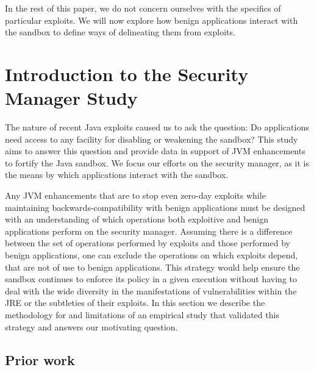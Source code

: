 \documentclass{sig-alternate}
\begin{document}
In the rest of this paper, we do not concern ourselves with the specifics of
particular exploits. We will now explore how benign applications interact with
the sandbox to define ways of delineating them from exploits.


\section{Introduction to the Security Manager Study}\label{sec:Security-Manager-Study}

The nature of recent Java exploits caused us to ask the question: Do applications need access to any facility for disabling or weakening the sandbox? This study aims to answer this question and provide data in support of JVM enhancements to fortify the Java sandbox.
We focus our efforts on the security manager, as it is the means by
which applications interact with the sandbox. 

Any JVM enhancements that are to stop even zero-day exploits while maintaining backwards-compatibility with benign applications must be designed with an understanding of which operations both exploitive
and benign applications perform on the security manager. Assuming
there is a difference between the set of operations performed by exploits
and those performed by benign applications, one can exclude the operations
on which exploits depend, that are not of use to benign applications. This strategy would help ensure the sandbox
continues to enforce its policy in a given execution without having
to deal with the wide diversity in the manifestations of vulnerabilities
within the JRE or the subtleties of their exploits. In this section
we describe the methodology for and limitations of an empirical study
that validated this strategy and answers our motivating question.


\subsection{Prior work}
\end{document}
